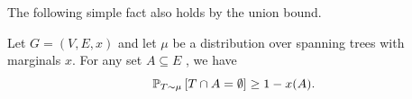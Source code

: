 The following simple fact also holds by the union bound.
\begin{fact}\label{fact:0edgerandomspanningtree}
Let $G=(V,E,x)$ and let $\mu$ be a distribution over spanning trees with marginals $x$. For any set $A\subseteq E$	, we have
$$ {\mathbb{P}}_{T\sim\mu}\left[T\cap A=\emptyset\right] \geq 1-x(A).$$
\end{fact}




